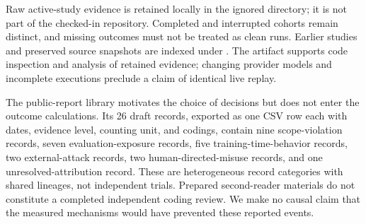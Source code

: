 \documentclass[letterpaper]{article}
\begin{document}
Raw active-study evidence is retained locally in the ignored  directory; it is not part of the checked-in repository. Completed and interrupted cohorts remain distinct, and missing outcomes must not be treated as clean runs. Earlier studies and preserved source snapshots are indexed under . The artifact supports code inspection and analysis of retained evidence; changing provider models and incomplete executions preclude a claim of identical live replay.

The public-report library motivates the choice of decisions but does not enter the outcome calculations. Its 26 draft records, exported as one CSV row each with dates, evidence level, counting unit, and codings, contain nine scope-violation records, seven evaluation-exposure records, five training-time-behavior records, two external-attack records, two human-directed-misuse records, and one unresolved-attribution record. These are heterogeneous record categories with shared lineages, not independent trials. Prepared second-reader materials do not constitute a completed independent coding review. We make no causal claim that the measured mechanisms would have prevented these reported events.
\end{document}
